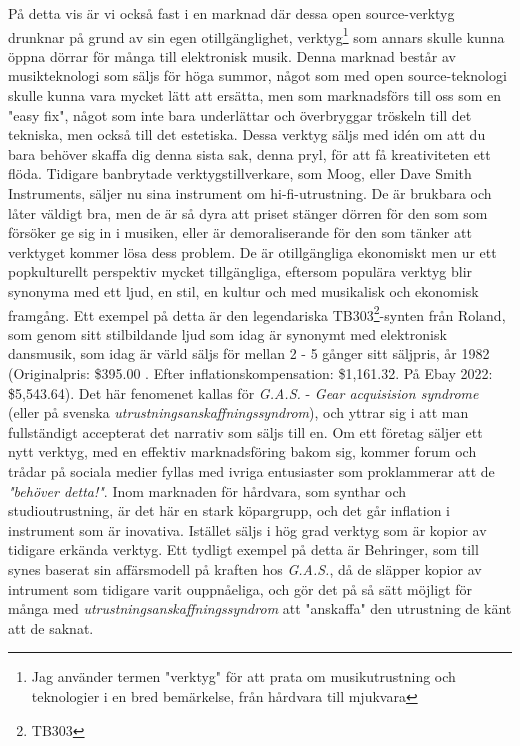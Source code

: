 \documentclass{article}
\begin{document}
På detta vis är vi också fast i en marknad där dessa open source-verktyg drunknar på grund av sin egen
otillgänglighet, verktyg\footnote{Jag använder termen "verktyg" för att prata om musikutrustning och
teknologier i en bred bemärkelse, från hårdvara till mjukvara} som annars skulle kunna öppna dörrar för många
till elektronisk musik. Denna marknad består av musikteknologi som säljs för höga summor, något som med open
source-teknologi skulle kunna vara mycket lätt att ersätta, men som marknadsförs till oss som en "easy fix",
något som inte bara underlättar och överbryggar tröskeln till det tekniska, men också till det estetiska.
Dessa verktyg säljs med idén om att du bara behöver skaffa dig denna sista sak, denna pryl, för att få
kreativiteten ett flöda.
Tidigare banbrytade verktygstillverkare, som Moog, eller Dave Smith Instruments, säljer nu sina instrument
om hi-fi-utrustning. De är brukbara och låter väldigt bra, men de är så dyra att priset stänger dörren för
den som som försöker ge sig in i musiken, eller är demoraliserande för den som tänker att verktyget kommer
lösa dess problem. De är otillgängliga ekonomiskt men ur ett popkulturellt perspektiv mycket tillgängliga,
eftersom populära verktyg blir synonyma med ett ljud, en stil, en kultur och med musikalisk och ekonomisk
framgång. Ett exempel på detta är den legendariska TB303\footnote{TB303}-synten från Roland, som genom sitt
stilbildande ljud som idag är synonymt med elektronisk dansmusik, som idag är värld säljs för mellan 2 - 5
gånger sitt säljpris, år 1982 (Originalpris: \$395.00 . Efter inflationskompensation: \$1,161.32. På Ebay
2022: \$5,543.64).
Det här fenomenet kallas för \emph{G.A.S.} - \emph{Gear acquisision syndrome} (eller på svenska
\emph{utrustningsanskaffningssyndrom}), och yttrar sig i att man fullständigt accepterat det narrativ som säljs
till en. Om ett företag säljer ett nytt verktyg, med en effektiv marknadsföring bakom sig, kommer forum och
trådar på sociala medier fyllas med ivriga entusiaster som proklammerar att de \emph{"behöver detta!"}. Inom
marknaden för hårdvara, som synthar och studioutrustning, är det här en stark köpargrupp, och det går
inflation i instrument som är inovativa. Istället säljs i hög grad verktyg som är kopior av tidigare erkända
verktyg. Ett tydligt exempel på detta är Behringer, som till synes baserat sin affärsmodell på kraften hos
\emph{G.A.S.}, då de släpper kopior av intrument som tidigare varit ouppnåeliga, och gör det på så sätt möjligt
för många med \emph{utrustningsanskaffningssyndrom} att "anskaffa" den utrustning de känt att de saknat. 
\end{document}
